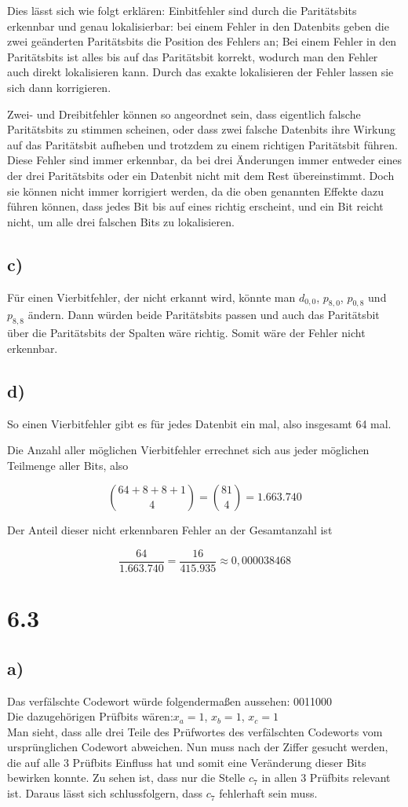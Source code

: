 \documentclass{article}
\begin{document}
		Dies lässt sich wie folgt erklären:
		Einbitfehler sind durch die Paritätsbits erkennbar und genau lokalisierbar: bei einem Fehler in den Datenbits geben die zwei geänderten Paritätsbits die Position des Fehlers an; Bei einem Fehler in den Paritätsbits ist alles bis auf das Paritätsbit korrekt, wodurch man den Fehler auch direkt lokalisieren kann.
		Durch das exakte lokalisieren der Fehler lassen sie sich dann korrigieren.

		Zwei- und Dreibitfehler können so angeordnet sein, dass eigentlich falsche Paritätsbits zu stimmen scheinen, oder dass zwei falsche Datenbits ihre Wirkung auf das Paritätsbit aufheben und trotzdem zu einem richtigen Paritätsbit führen.
		Diese Fehler sind immer erkennbar, da bei drei Änderungen immer entweder eines der drei Paritätsbits oder ein Datenbit nicht mit dem Rest übereinstimmt. Doch sie können nicht immer korrigiert werden, da die oben genannten Effekte dazu führen können, dass jedes Bit bis auf eines richtig erscheint, und ein Bit reicht nicht, um alle drei falschen Bits zu lokalisieren.

	\subsection*{c)}
		Für einen Vierbitfehler, der nicht erkannt wird, könnte man $d_{0,0}$, $p_{8,0}$, $p_{0,8}$ und $p_{8,8}$ ändern. Dann würden beide Paritätsbits passen und auch das Paritätsbit über die Paritätsbits der Spalten wäre richtig. Somit wäre der Fehler nicht erkennbar.

	\subsection*{d)}
		So einen Vierbitfehler gibt es für jedes Datenbit ein mal, also insgesamt 64 mal. 

		Die Anzahl aller möglichen Vierbitfehler errechnet sich aus jeder möglichen Teilmenge aller Bits, also

		\[{64 + 8 + 8 + 1 \choose 4} = {81 \choose 4} = 1.663.740\]

		Der Anteil dieser nicht erkennbaren Fehler an der Gesamtanzahl ist

		\[\frac{64}{1.663.740} = \frac{16}{415.935} \approx 0,000038468\]

\section*{6.3}
	\subsection*{a)}
		Das verfälschte Codewort würde folgendermaßen aussehen: 0011000 \\
		Die dazugehörigen Prüfbits wären:$x_a=1$, $x_b=1$, $x_c=1$ \\
		Man sieht, dass alle drei Teile des Prüfwortes des verfälschten Codeworts vom ursprünglichen Codewort abweichen. Nun muss nach der Ziffer gesucht werden, die auf alle 3 Prüfbits Einfluss hat und somit eine Veränderung dieser Bits bewirken konnte. Zu sehen ist, dass nur die Stelle $c_7$ in allen 3 Prüfbits relevant ist. Daraus lässt sich schlussfolgern, dass $c_7$ fehlerhaft sein muss.
\end{document}
